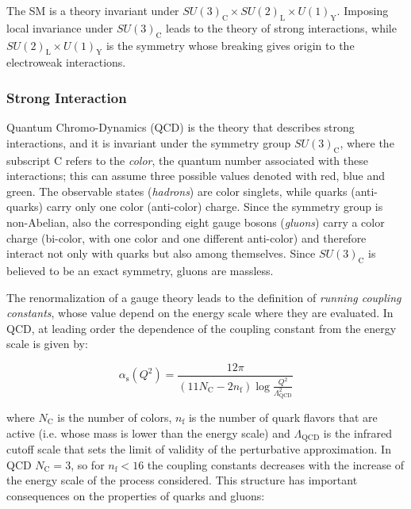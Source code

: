 The SM is a theory invariant under $SU(3)_\mathrm{C} \times SU(2)_\mathrm{L} \times U(1)_\mathrm{Y}$. Imposing local invariance under $SU(3)_\mathrm{C}$ leads to the theory of strong interactions, while $SU(2)_\mathrm{L} \times U(1)_\mathrm{Y}$ is the symmetry whose breaking gives origin to the electroweak interactions. 

\subsubsection{Strong Interaction}
\label{sec:strong}

Quantum Chromo-Dynamics (QCD) is the theory that describes strong interactions, and it is invariant under the symmetry group $SU(3)_\mathrm{C}$, where the subscript C refers to the \textit{color}, the quantum number associated with these interactions; this can assume three possible values denoted with red, blue and green. The observable states (\textit{hadrons}) are color singlets, while quarks (anti-quarks) carry only one color (anti-color) charge. Since the symmetry group is non-Abelian, also the corresponding eight gauge bosons (\textit{gluons}) carry a color charge (bi-color, with one color and one different anti-color) and therefore interact not only with quarks but also among themselves. Since $SU(3)_\mathrm{C}$ is believed to be an exact symmetry,  gluons are massless. 

The renormalization of a gauge theory leads to the definition of \textit{running coupling constants}, whose value depend on the energy scale where they are evaluated. In QCD, at leading order the dependence of the coupling constant from the energy scale is given by:

\begin{equation}
\alpha_\mathrm{s}(Q^2)=\frac{12\pi}{\left(11N_\mathrm{C}-2n_\mathrm{f}\right)\log{\frac{Q^2}{\Lambda_\mathrm{QCD}^2}}} 
\label{eq:alfaQCD}
\end{equation}

\noindent where $N_\mathrm{C}$ is the number of colors, $n_\mathrm{f}$ is the number of quark flavors that are active (i.e. whose mass is lower than the energy scale) and $\Lambda_\mathrm{QCD}$ is the infrared cutoff scale that sets the limit of validity of the perturbative approximation. In QCD $N_\mathrm{C} = 3$, so for $n_\mathrm{f}<16$ the coupling constants decreases with the increase of the energy scale of the process considered. This structure has important consequences on the properties of quarks and gluons:

